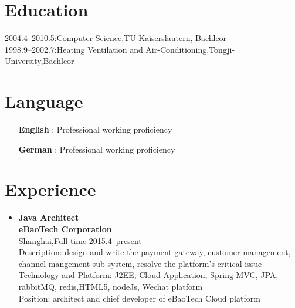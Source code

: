 \documentclass[a4paper,11pt]{res}
\begin{document}
 

\address{\bf  Permanent Address\\Donglu Lu 1350 Nong 21 Hao 501 Shi\\201206 Shanghai\\0086-18101890138\\klose911@googlemail.com}

\begin{resume}

  \section{Education}          
  2004.4--2010.5:\hfill Computer Science,TU Kaiserslautern, Bachleor\\
  1998.9--2002.7:\hfill Heating Ventilation and Air-Conditioning,Tongji-University,Bachleor

  \section{Language}
  \begin{itemize}
  \item[{\bf English}]: \hfill Professional working proficiency
  \item[{\bf German}]: \hfill Professional working proficiency
  \end{itemize}

  \section{Experience}

  \begin{itemize}
  \item{\bf Java Architect}\\ {\bf eBaoTech Corporation}\\ Shanghai,Full-time \hfill 2015.4--present\\
    Description: design and write the payment-gateway,
    customer-management, channel-mangement sub-system,
    resolve the platform's critical issue \\  
    Technology and Platform: J2EE, Cloud Application, Spring
    MVC, JPA, rabbitMQ, redis,HTML5, nodeJs, Wechat platform  \\
    Position: architect and chief developer of eBaoTech Cloud platform \\


\end{itemize}
\end{resume}
\end{document}
